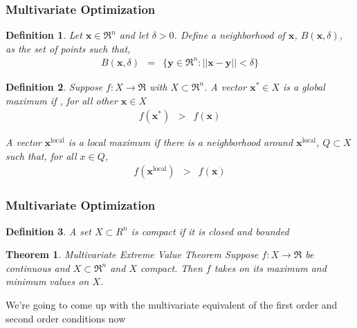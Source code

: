 \documentclass{beamer}
\newtheorem{thm}{Theorem}
\newtheorem{defn}{Definition}
\numberwithin{equation}{section}
\begin{document}
\begin{frame}
\frametitle{Multivariate Optimization}

\begin{defn} 
Let $\boldsymbol{x} \in \Re^{n}$ and let $\delta >0$.  Define a \alert{neighborhood} of $\boldsymbol{x}$, $B(\boldsymbol{x}, \delta)$, as the set of points such that, 
\begin{eqnarray}
B(\boldsymbol{x}, \delta) & = & \{ \boldsymbol{y} \in \Re^{n} : ||\boldsymbol{x} - \boldsymbol{y}||< \delta \}  \nonumber 
\end{eqnarray}



\end{defn}

\begin{defn} Suppose $f:X \rightarrow \Re$ with $X \subset \Re^{n}$.  A vector $\boldsymbol{x}^{*} \in X$ is a \alert{global maximum} if , for all other $\boldsymbol{x} \in X$ 
\begin{eqnarray}
f(\boldsymbol{x}^{*}) & > & f(\boldsymbol{x} ) \nonumber 
\end{eqnarray}

A vector $\boldsymbol{x}^{\text{local}}$ is a \alert{local} maximum if there is a neighborhood around $\boldsymbol{x}^{\text{local}}$, $Q \subset X$ such that, for all $x \in Q$, 
\begin{eqnarray}
f(\boldsymbol{x}^{\text{local} }) & > & f(\boldsymbol{x} ) \nonumber 
\end{eqnarray}
\end{defn}


\end{frame}

\begin{frame}
\frametitle{Multivariate Optimization}
\begin{defn} A set $X\subset R^{n}$ is \alert{compact} if it is closed and bounded
\end{defn} 



\begin{thm} \alert{Multivariate Extreme Value Theorem} Suppose $f:X \rightarrow \Re$ be continuous and $X \subset \Re^{n}$ and $X$ compact.  Then $f$ takes on its \alert{maximum} and \alert{minimum} values on $X$.  
\end{thm}

We're going to come up with the multivariate equivalent of the \alert{first order} and \alert{second order} conditions now


\end{frame}
\end{document}
